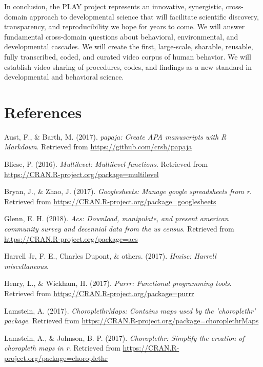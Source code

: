 \documentclass[english,man]{apa6}
\theoremstyle{definition}
\theoremstyle{definition}
\theoremstyle{definition}
\theoremstyle{remark}
\begin{document}
In conclusion, the PLAY project represents an innovative, synergistic,
cross-domain approach to developmental science that will facilitate
scientific discovery, transparency, and reproducibility we hope for
years to come. We will answer fundamental cross-domain questions about
behavioral, environmental, and developmental cascades. We will create
the first, large-scale, sharable, reusable, fully transcribed, coded,
and curated video corpus of human behavior. We will establish video
sharing of procedures, codes, and findings as a new standard in
developmental and behavioral science.

\newpage

\section{References}\label{references}

\setlength{\parindent}{-0.5in} \setlength{\leftskip}{0.5in}

\hypertarget{refs}{}
\hypertarget{ref-R-papaja}{}
Aust, F., \& Barth, M. (2017). \emph{papaja: Create APA manuscripts with
R Markdown}. Retrieved from \url{https://github.com/crsh/papaja}

\hypertarget{ref-R-multilevel}{}
Bliese, P. (2016). \emph{Multilevel: Multilevel functions}. Retrieved
from \url{https://CRAN.R-project.org/package=multilevel}

\hypertarget{ref-R-googlesheets}{}
Bryan, J., \& Zhao, J. (2017). \emph{Googlesheets: Manage google
spreadsheets from r}. Retrieved from
\url{https://CRAN.R-project.org/package=googlesheets}

\hypertarget{ref-R-acs}{}
Glenn, E. H. (2018). \emph{Acs: Download, manipulate, and present
american community survey and decennial data from the us census}.
Retrieved from \url{https://CRAN.R-project.org/package=acs}

\hypertarget{ref-R-Hmisc}{}
Harrell Jr, F. E., Charles Dupont, \& others. (2017). \emph{Hmisc:
Harrell miscellaneous}.

\hypertarget{ref-R-purrr}{}
Henry, L., \& Wickham, H. (2017). \emph{Purrr: Functional programming
tools}. Retrieved from \url{https://CRAN.R-project.org/package=purrr}

\hypertarget{ref-R-choroplethrMaps}{}
Lamstein, A. (2017). \emph{ChoroplethrMaps: Contains maps used by the
'choroplethr' package}. Retrieved from
\url{https://CRAN.R-project.org/package=choroplethrMaps}

\hypertarget{ref-R-choroplethr}{}
Lamstein, A., \& Johnson, B. P. (2017). \emph{Choroplethr: Simplify the
creation of choropleth maps in r}. Retrieved from
\url{https://CRAN.R-project.org/package=choroplethr}
\end{document}
